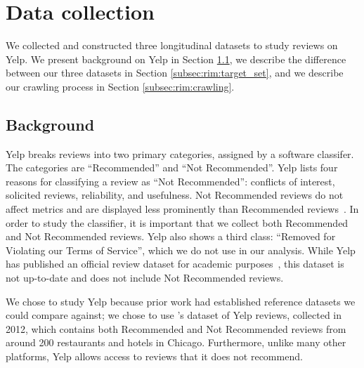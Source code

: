 \section{Data collection} \label{sec:rim:dataset}

We collected and constructed three longitudinal datasets to study reviews on Yelp. We present background on Yelp in Section \ref{subsec:rim:background}, we describe the difference between our three datasets in Section \ref{subsec:rim:target_set}, and we describe our crawling process in Section \ref{subsec:rim:crawling}.




 

\subsection{Background} \label{subsec:rim:background}

Yelp breaks reviews into two primary categories, assigned by a software classifer. The categories are ``Recommended'' and ``Not Recommended''. Yelp lists four reasons for classifying a review as ``Not Recommended'': conflicts of interest, solicited reviews, reliability, and usefulness. Not Recommended reviews do not affect metrics and are displayed less prominently than Recommended reviews~\cite{yelpwhyrec,yelprecommendationsoftware,yelpstarrating}. In order to study the classifier, it is important that we collect both Recommended and Not Recommended reviews. Yelp also shows a third class: ``Removed for Violating our Terms of Service'', which we do not use in our analysis. While Yelp has published an official review dataset for academic purposes~\cite{yelpacademicdataset}, this dataset is not up-to-date and does not include Not Recommended reviews.

We chose to study Yelp because prior work had established reference datasets we could compare against; we chose to use \citet{mukherjee2013yelp}'s dataset of Yelp reviews, collected in 2012, which contains both Recommended and Not Recommended reviews from around 200 restaurants and hotels in Chicago.
Furthermore, unlike many other platforms, Yelp allows access to reviews that it does not recommend.







